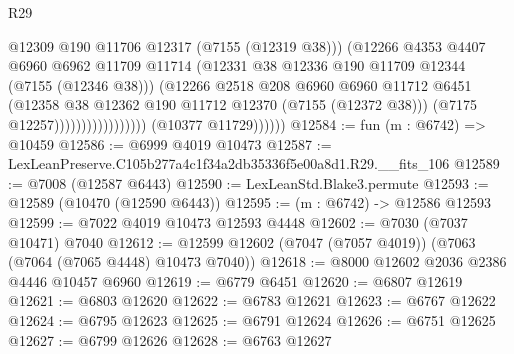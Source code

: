 \begin{lexlean}{R29}
\begin{coremodule}
                                            @12309
                                            @190
                                            @11706
                                            @12317
                                            (@7155 (@12319 @38)))
                                          (@12266
                                            @4353
                                            @4407
                                            @6960
                                            @6962
                                            @11709
                                            @11714
                                            (@12331
                                              @38
                                              @12336
                                              @190
                                              @11709
                                              @12344
                                              (@7155 (@12346 @38)))
                                            (@12266
                                              @2518
                                              @208
                                              @6960
                                              @6960
                                              @11712
                                              @6451
                                              (@12358
                                                @38
                                                @12362
                                                @190
                                                @11712
                                                @12370
                                                (@7155 (@12372 @38)))
                                              (@7175 @12257)))))))))))))))))
              (@10377 @11729))))))
@12584 := fun (m : @6742) => @10459
@12586 := @6999 @4019 @10473
@12587 := LexLeanPreserve.C105b277a4c1f34a2db35336f5e00a8d1.R29.__fits_106
@12589 := @7008 (@12587 @6443)
@12590 := LexLeanStd.Blake3.permute
@12593 := @12589 (@10470 (@12590 @6443))
@12595 := (m : @6742) -> @12586 @12593
@12599 := @7022 @4019 @10473 @12593 @4448
@12602 := @7030 (@7037 @10471) @7040
@12612 := @12599 @12602 (@7047 (@7057 @4019)) (@7063 (@7064 (@7065 @4448) @10473 @7040))
@12618 := @8000 @12602 @2036 @2386 @4446 @10457 @6960
@12619 := @6779 @6451
@12620 := @6807 @12619
@12621 := @6803 @12620
@12622 := @6783 @12621
@12623 := @6767 @12622
@12624 := @6795 @12623
@12625 := @6791 @12624
@12626 := @6751 @12625
@12627 := @6799 @12626
@12628 := @6763 @12627

\end{coremodule}
\end{lexlean}
